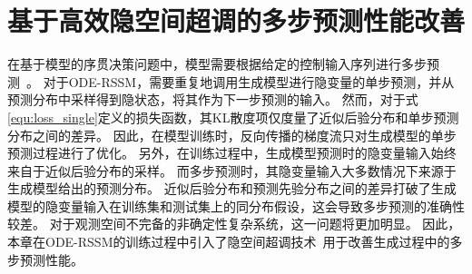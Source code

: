 \section{基于高效隐空间超调的多步预测性能改善}
\label{sec:5_overshooting}
在基于模型的序贯决策问题中，模型需要根据给定的控制输入序列进行多步预测~\cite{Hafner2019}。
对于ODE-RSSM，需要重复地调用生成模型进行隐变量的单步预测，并从预测分布中采样得到隐状态，将其作为下一步预测的输入。
然而，对于式\eqref{equ:loss_single}定义的损失函数，其KL散度项仅度量了近似后验分布和单步预测分布之间的差异。
因此，在模型训练时，反向传播的梯度流只对生成模型的单步预测过程进行了优化。
另外，在训练过程中，生成模型预测时的隐变量输入始终来自于近似后验分布的采样。
而多步预测时，其隐变量输入大多数情况下来源于生成模型给出的预测分布。
近似后验分布和预测先验分布之间的差异打破了生成模型的隐变量输入在训练集和测试集上的同分布假设，这会导致多步预测的准确性较差\cite{venkatraman2015improving}。
对于观测空间不完备的非确定性复杂系统，这一问题将更加明显。
因此，本章在ODE-RSSM的训练过程中引入了隐空间超调技术~\cite{Hafner2019}用于改善生成过程中的多步预测性能。

